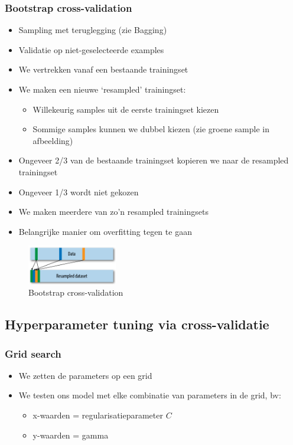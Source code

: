 \documentclass{article}
\begin{document}
\subsubsection{Bootstrap cross-validation}

\begin{itemize}
    \item Sampling met teruglegging (zie Bagging)
    \item Validatie op niet-geselecteerde examples
    \item We vertrekken vanaf een bestaande trainingset
    \item We maken een nieuwe `resampled' trainingset:
    \begin{itemize}
        \item Willekeurig samples uit de eerste trainingset kiezen
        \item Sommige samples kunnen we dubbel kiezen (zie groene sample in afbeelding)
    \end{itemize}
    \item Ongeveer 2/3 van de bestaande trainingset kopieren we naar de resampled trainingset
    \item Ongeveer 1/3 wordt niet gekozen
    \item We maken meerdere van zo'n resampled trainingsets
    \item Belangrijke manier om overfitting tegen te gaan
\end{itemize}

\begin{figure}[H]
    \centering
    \includegraphics[width=0.35\textwidth]{cross-validation-bootstrap.png}
    \caption{Bootstrap cross-validation}
\end{figure}

\subsection{Hyperparameter tuning via cross-validatie}

\subsubsection{Grid search}

\begin{itemize}
    \item We zetten de parameters op een grid
    \item We testen ons model met elke combinatie van parameters in de grid, bv:
    \begin{itemize}
        \item x-waarden = regularisatieparameter $C$
        \item y-waarden = gamma
    \end{itemize}
\end{itemize}
\end{document}
